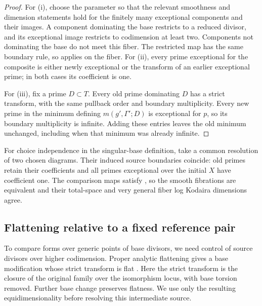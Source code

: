 \begin{proof}
For (i), choose the parameter so that the relevant smoothness and
dimension statements hold for the finitely many exceptional components
and their images. A component dominating the base restricts to a
reduced divisor, and its exceptional image restricts to codimension at
least two. Components not dominating the base do not meet this fiber.
The restricted map has the same boundary rule, so
 applies on the fiber. For (ii), every
prime exceptional for the composite is either newly exceptional or the
transform of an earlier exceptional prime; in both cases its coefficient
is one.

For (iii), fix a prime $D\subset T$. Every old prime dominating $D$
has a strict transform, with the same pullback order and boundary
multiplicity. Every new prime in the minimum defining
$m(g',\Gamma';D)$ is exceptional for $p$, so its boundary multiplicity
is infinite. Adding these entries leaves the old minimum unchanged,
including when that minimum was already infinite.
\end{proof}

For choice independence in the singular-base definition, take a common
resolution of two chosen diagrams. Their induced source boundaries
coincide: old primes retain their coefficients and all primes exceptional
over the initial $X$ have coefficient one. The comparison maps satisfy
, so the smooth fibrations are equivalent
and their total-space and very general fiber log Kodaira dimensions agree.

\subsection{Flattening relative to a fixed reference pair}

To compare forms over generic points of base divisors, we need control of
source divisors over higher codimension. Proper analytic flattening gives
a base modification whose strict transform is flat
\cite{HironakaFlattening,FujikiDouady}. Here the strict transform is the
closure of the original family over the isomorphism locus, with base
torsion removed. Further base change preserves flatness. We use only
the resulting equidimensionality before resolving this intermediate
source.

